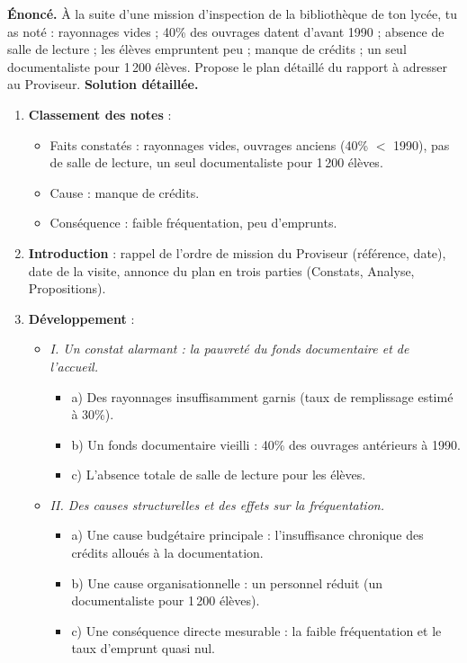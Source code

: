 \documentclass[11pt]{article}
\begin{document}
\begin{exoresolu}
\textbf{Énoncé.} À la suite d'une mission d'inspection de la bibliothèque de ton lycée, tu as noté : rayonnages vides ; 40\% des ouvrages datent d'avant 1990 ; absence de salle de lecture ; les élèves empruntent peu ; manque de crédits ; un seul documentaliste pour 1\,200 élèves. Propose le plan détaillé du rapport à adresser au Proviseur.
\tcblower
\textbf{Solution détaillée.}
\begin{enumerate}
\item \textbf{Classement des notes} :
\begin{itemize}
\item Faits constatés : rayonnages vides, ouvrages anciens (40\% $<$ 1990), pas de salle de lecture, un seul documentaliste pour 1\,200 élèves.
\item Cause : manque de crédits.
\item Conséquence : faible fréquentation, peu d'emprunts.
\end{itemize}
\item \textbf{Introduction} : rappel de l'ordre de mission du Proviseur (référence, date), date de la visite, annonce du plan en trois parties (Constats, Analyse, Propositions).
\item \textbf{Développement} :
\begin{itemize}
\item \emph{I. Un constat alarmant : la pauvreté du fonds documentaire et de l'accueil.}
\begin{itemize}
\item a) Des rayonnages insuffisamment garnis (taux de remplissage estimé à 30\%).
\item b) Un fonds documentaire vieilli : 40\% des ouvrages antérieurs à 1990.
\item c) L'absence totale de salle de lecture pour les élèves.
\end{itemize}
\item \emph{II. Des causes structurelles et des effets sur la fréquentation.}
\begin{itemize}
\item a) Une cause budgétaire principale : l'insuffisance chronique des crédits alloués à la documentation.
\item b) Une cause organisationnelle : un personnel réduit (un documentaliste pour 1\,200 élèves).
\item c) Une conséquence directe mesurable : la faible fréquentation et le taux d'emprunt quasi nul.
\end{itemize}

\end{itemize}
\end{enumerate}
\end{exoresolu}
\end{document}
